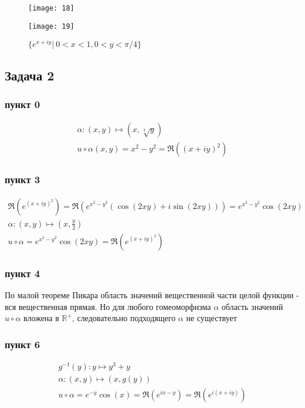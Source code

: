 	\begin{figure}[!h]
		\begin{minipage}[h]{0.49\linewidth}
			\center\texttt{[image: 18]}
			\caption{$\{e^{x+iy}|\ 5\pi/3 < y < 8\pi/3\}$}
		\end{minipage}
		\begin{minipage}[h]{0.49\linewidth}
			\center\texttt{[image: 19]}
			\caption{$\{e^{x+iy}|\ 0<x<1, 0<y<\pi/4\}$}
		\end{minipage}
	\end{figure}
\newpage


\subsection*{Задача 2}
\subsubsection*{пункт 0}
	\begin{gather*}
		\alpha: (x,y) \mapsto (x, \sqrt[3]{y})\\
		u \circ \alpha (x,y) = x^2 - y^2 = \Re((x+iy)^2)
	\end{gather*}
\subsubsection*{пункт 3}
	\begin{gather*}
		\Re(e^{(x+iy)^2}) = \Re(e^{x^2 - y^2}(\cos(2xy) + i \sin(2xy))) = e^{x^2 - y^2} \cos(2xy)\\
		\alpha: (x,y) \mapsto (x, \frac{y}{2})\\
		u \circ \alpha = e^{x^2 - y^2} \cos(2xy) = \Re(e^{(x+iy)^2})
	\end{gather*}
\subsubsection*{пункт 4}
	По малой теореме Пикара область значений вещественной части целой функции - вся вещественная прямая. Но для любого гомеоморфизма $\alpha$ область значений $u \circ \alpha$ вложена в $\mathbb{R}^{+}$, следовательно подходящего $\alpha$ не существует
\subsubsection*{пункт 6}
	\begin{gather*}
		g^{-1}(y): y \mapsto y^3 + y\\
		\alpha: (x,y) \mapsto (x, g(y))\\
		u \circ \alpha = e^{-y} \cos(x) = \Re(e^{ix - y}) = \Re(e^{i(x+iy)})
	\end{gather*}
